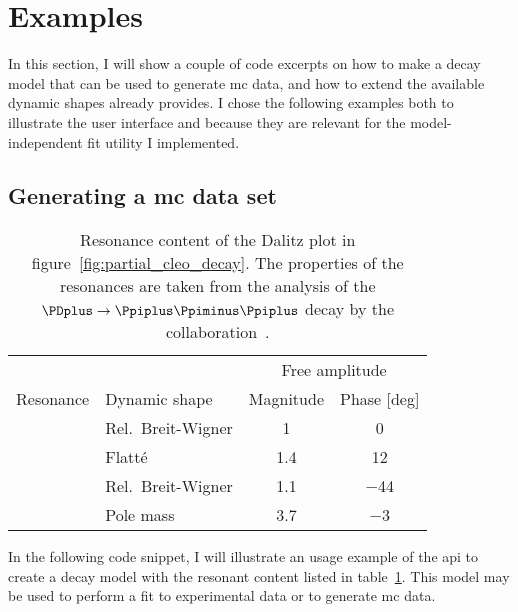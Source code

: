     \section{Examples}

        In this section, I will show a couple of code excerpts on how to make a decay model that can be used to generate \ac{mc} data, and how to extend the available dynamic shapes  already provides.
        I chose the following examples both to illustrate the user interface and because they are relevant for the model-independent fit utility I implemented.

        \subsection{\texorpdfstring{Generating a \acs{mc} data set}{Generating a MC data set}}
        

        \begin{table}
            \centering
            \caption{Resonance content of the Dalitz plot in figure~\ref{fig:partial_cleo_decay}. The properties of the resonances are taken from the analysis of the $\PDplus\to\Ppiplus\Ppiminus\Ppiplus$ decay by the \cleo{} collaboration~\cite{PhysRevD.76.012001}.}
            \label{tab:cleo_model}
            \begin{tabular}{llcc}
                \toprule
                            &                  &\multicolumn{2}{c}{Free amplitude}  \\ \cline{3-4}
                Resonance   &Dynamic shape     &Magnitude  &Phase [deg]\\
                \midrule
                \Prhozero{} &Rel.~Breit-Wigner &\num{1}    &\num{0}   \\
                \Pfnez{}    &Flatté            &\num{1.4}  &\num{12}  \\
                \Pfofzz{}   &Rel.~Breit-Wigner &\num{1.1}  &\num{-44} \\
                \Psigma{}   &Pole mass         &\num{3.7}  &\num{-3}  \\
                \bottomrule
            \end{tabular}
        \end{table}
        In the following code snippet, I will illustrate an usage example of the \ac{api} to create a decay model with the resonant content listed in table~\ref{tab:cleo_model}.
        This model may be used to perform a fit to experimental data or to generate \ac{mc} data.

